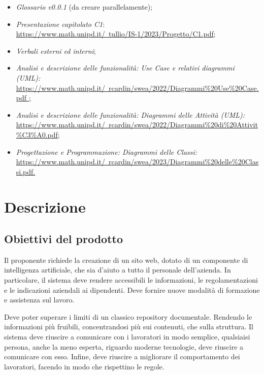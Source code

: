 \documentclass[10pt, a4paper]{article}
\begin{document}
    \begin{itemize}
    \item \textit{Glossario v0.0.1} (da creare parallelamente); 
    \item \textit{Presentazione capitolato C1}:\\
    \href{https://www.math.unipd.it/~tullio/IS-1/2023/Progetto/C1.pdf}{https://www.math.unipd.it/~tullio/IS-1/2023/Progetto/C1.pdf};
    \item \textit{Verbali esterni ed interni};
    \item \textit{Analisi e descrizione delle funzionalità: Use Case e relativi diagrammi (UML):}\\
    \href{https://www.math.unipd.it/~rcardin/swea/2022/Diagrammi%20Use%20Case.pdf}{https://www.math.unipd.it/~rcardin/swea/2022/Diagrammi\%20Use\%20Case.pdf ;}
    \item \textit{Analisi e descrizione delle funzionalità: Diagrammi delle Attività (UML):}\\
    \href{https://www.math.unipd.it/~rcardin/swea/2022/Diagrammi%20di%20Attivit%C3%A0.pdf}{https://www.math.unipd.it/~rcardin/swea/2022/Diagrammi\%20di\%20Attivit\%C3\%A0.pdf;}
    

    \item \textit{Progettazione e Programmazione: Diagrammi delle Classi:}\\
    \href{https://www.math.unipd.it/~rcardin/swea/2023/Diagrammi%20delle%20Classi.pdf}{https://www.math.unipd.it/~rcardin/swea/2023/Diagrammi\%20delle\%20Classi.pdf.}
    \end{itemize}
    
\newpage
\section{Descrizione}
\subsection{Obiettivi del prodotto}
Il proponente richiede la creazione di un sito web, dotato di un componente di intelligenza artificiale, che sia d'aiuto a tutto il personale dell'azienda.
In particolare, il sistema deve rendere accessibili le informazioni, le regolamentazioni e le indicazioni aziendali ai dipendenti.
Deve fornire nuove modalità di formazione e assistenza sul lavoro.

Deve poter superare i limiti di un classico repository documentale. Rendendo le informazioni più fruibili, concentrandosi più sui contenuti, che sulla struttura.
Il sistema deve riuscire a comunicare con i lavoratori in modo semplice, qualsiaisi persona, anche la meno esperta, riguardo moderne tecnologie, deve riuscire a comunicare con esso.
Infine, deve riuscire a migliorare il comportamento dei lavoratori, facendo in modo che rispettino le regole.
\end{document}
